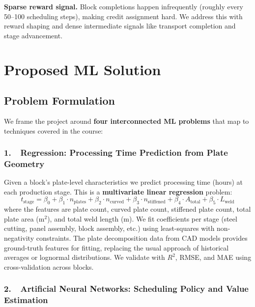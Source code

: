 \documentclass[12pt,letterpaper]{article}
\begin{document}
\textbf{Sparse reward signal.} Block completions happen infrequently (roughly every 50--100 scheduling steps), making credit assignment hard. We address this with reward shaping and dense intermediate signals like transport completion and stage advancement.

\section{Proposed ML Solution}

\subsection{Problem Formulation}

We frame the project around \textbf{four interconnected ML problems} that map to techniques covered in the course:

\subsubsection*{1.\ \ Regression: Processing Time Prediction from Plate Geometry}

Given a block's plate-level characteristics we predict processing time (hours) at each production stage. This is a \textbf{multivariate linear regression} problem:
\begin{equation}
  t_{\text{stage}} = \beta_0 + \beta_1 \cdot n_{\text{plates}} + \beta_2 \cdot n_{\text{curved}} + \beta_3 \cdot n_{\text{stiffened}} + \beta_4 \cdot A_{\text{total}} + \beta_5 \cdot L_{\text{weld}}
  \label{eq:regression}
\end{equation}
where the features are plate count, curved plate count, stiffened plate count, total plate area ($\text{m}^2$), and total weld length (m). We fit coefficients per stage (steel cutting, panel assembly, block assembly, etc.) using least-squares with non-negativity constraints. The plate decomposition data from CAD models provides ground-truth features for fitting, replacing the usual approach of historical averages or lognormal distributions. We validate with $R^2$, RMSE, and MAE using cross-validation across blocks.

\subsubsection*{2.\ \ Artificial Neural Networks: Scheduling Policy and Value Estimation}
\end{document}
